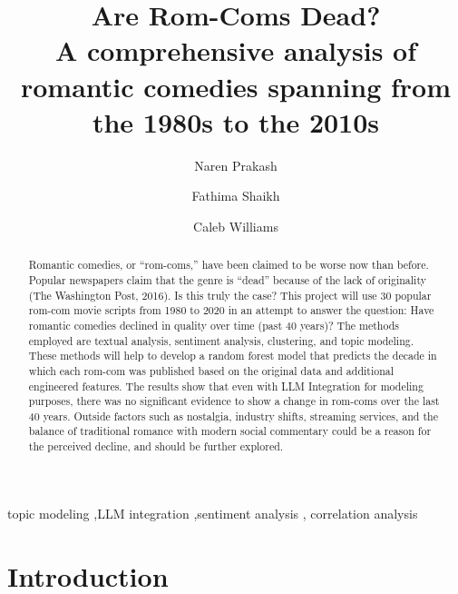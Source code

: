 \documentclass[
  authoryear,
  preprint]{elsarticle}
\begin{document}
\begin{frontmatter}
\title{Are Rom-Coms Dead? \\\large{A comprehensive analysis of romantic
comedies spanning from the 1980s to the 2010s} }
\author[1]{Naren Prakash%
%
}

\author[1]{Fathima Shaikh%
%
}

\author[1]{Caleb Williams%
%
}






        
\begin{abstract}
Romantic comedies, or ``rom-coms,'' have been claimed to be worse now
than before. Popular newspapers claim that the genre is ``dead'' because
of the lack of originality (The Washington Post, 2016). Is this truly
the case? This project will use 30 popular rom-com movie scripts from
1980 to 2020 in an attempt to answer the question: Have romantic
comedies declined in quality over time (past 40 years)? The methods
employed are textual analysis, sentiment analysis, clustering, and topic
modeling. These methods will help to develop a random forest model that
predicts the decade in which each rom-com was published based on the
original data and additional engineered features. The results show that
even with LLM Integration for modeling purposes, there was no
significant evidence to show a change in rom-coms over the last 40
years. Outside factors such as nostalgia, industry shifts, streaming
services, and the balance of traditional romance with modern social
commentary could be a reason for the perceived decline, and should be
further explored.
\end{abstract}





\begin{keyword}
    topic modeling \sep LLM integration \sep sentiment analysis \sep 
    correlation analysis
\end{keyword}
\end{frontmatter}
    

\section{Introduction}\label{introduction}
\end{document}
